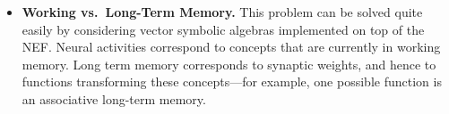 \documentclass[10pt,letterpaper,oneside]{article}
\begin{document}
\begin{itemize}
\begin{align*}
	\end{align*}
	Binding the variable with the rule results in the desired concept:
	\begin{align*}
		\Obj{RULE} \CC \Obj{VAR} &= ( \Obj{RED} \CC \Obj{NOUN} ) \CC ( \Obj{BALL} \CC \Obj{NOUN}^{-1} ) \\
		                         &= \Obj{RED} \CC \Obj{BALL} \CC ( \Obj{NOUN} \CC \Obj{NOUN}^{-1} ) \\
		                         &\approx \Obj{RED} \CC \Obj{BALL} \,.
	\end{align*}
	Note that we did not demand binding operators $\CC$ to be commutative in general; however, circular convolution happens to be commutative. For the above to work with a non-commutative binding operator, we can define $\Obj{VAR}$ as $\Obj{NOUN}^{-1} \CC \Obj{BALL}$.
	\item \textbf{Working vs.~Long-Term Memory.} This problem can be solved quite easily by considering vector symbolic algebras implemented on top of the NEF. Neural activities correspond to concepts that are currently in working memory. Long term memory corresponds to synaptic weights, and hence to functions transforming these concepts---for example, one possible function is an associative long-term memory.
\end{itemize}

\printbibliography
\end{document}
